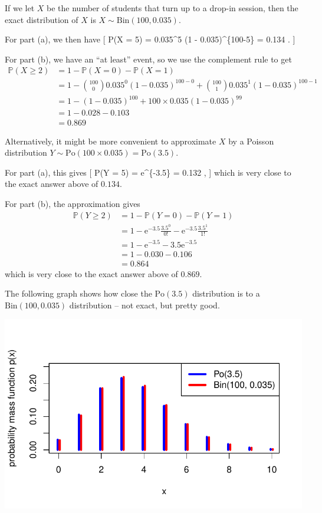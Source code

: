 \documentclass[
  letterpaper,
  DIV=11,
  numbers=noendperiod]{scrreprt}
\theoremstyle{remark}
\begin{document}
If we let \(X\) be the number of students that turn up to a drop-in
session, then the exact distribution of \(X\) is
\(X \sim \text{Bin}(100, 0.035)\).

For part (a), we then have {[} \mathbb P(X = 5) = 
0.035\^{}5 (1 - 0.035)\^{}\{100-5\} = 0.134 . {]}

For part (b), we have an ``at least'' event, so we use the complement
rule to get \begin{align*}
\mathbb P(X \geq 2)
&= 1 - \mathbb P(X = 0) - \mathbb P(X = 1) \\
&= 1 - \binom{100}{0} 0.035^0 (1 - 0.035)^{100-0} + \binom{100}{1} 0.035^1 (1 - 0.035)^{100 - 1} \\
&= 1 - (1 - 0.035)^{100} + 100 \times 0.035 (1 - 0.035)^{99} \\
&= 1 - 0.028 - 0.103 \\
&= 0.869
\end{align*}

Alternatively, it might be more convenient to approximate \(X\) by a
Poisson distribution
\(Y \sim \text{Po}(100 \times 0.035) = \text{Po}(3.5)\).

For part (a), this gives {[} \mathbb P(Y = 5) = \mathrm e\^{}\{-3.5\}
 = 0.132 , {]} which is very close to the exact answer
above of \(0.134\).

For part (b), the approximation gives \begin{align*}
\mathbb P(Y \geq 2)
&= 1 - \mathbb P(Y = 0) - \mathbb P(Y = 1) \\
&= 1 - \mathrm e^{-3.5} \frac{3.5^0}{0!} - \mathrm e^{-3.5} \frac{3.5^1}{1!} \\
&= 1 - \mathrm e^{-3.5} - 3.5 \mathrm e^{-3.5} \\
&= 1 - 0.030 - 0.106 \\
&= 0.864
\end{align*} which is very close to the exact answer above of \(0.869\).

The following graph shows how close the \(\text{Po}(3.5)\) distribution
is to a \(\text{Bin}(100, 0.035)\) distribution -- not exact, but pretty
good.

\includegraphics{sections/L12-poisson_files/figure-pdf/po-binom-pic-1.pdf}
\end{document}
